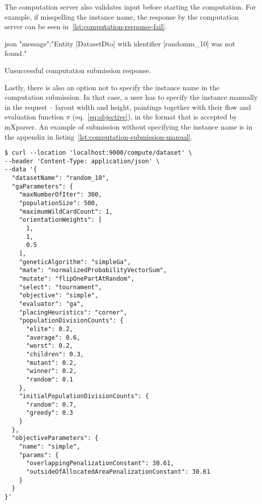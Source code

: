 The computation server also validates input before starting the computation.
For example, if misspelling the instance name, the response by the computation server can be seen in~\ref{lst:computation-response-fail}.

\begin{listing}[h!]
    \centering
    \begin{cminted}[autogobble,breaklines=true]{json}
    {
        "message":"Entity [DatasetDto] with identifier [randomm_10] was not found."
    }
    \end{cminted}
    \caption[Unsuccessful computation submission response]
    {Unsuccessful computation submission response.}
    \label{lst:computation-response-fail}
\end{listing}

Lastly, there is also an option not to specify the instance name in the computation submission.
In that case, a user has to specify the instance manually in the request – layout width and height,
paintings together with their flow and evaluation function $\pi$ (eq.~\ref{eq:objective}), in the format that is accepted by
mXparser\footnotemark[4].
An example of submission without specifying the instance name is in the appendix in listing~\ref{lst:computation-submission-manual}.

\begin{listing}[h!]
\centering
\begin{verbatim}
$ curl --location 'localhost:9000/compute/dataset' \
--header 'Content-Type: application/json' \
--data '{
  "datasetName": "random_10",
  "gaParameters": {
    "maxNumberOfIter": 300,
    "populationSize": 500,
    "maximumWildCardCount": 1,
    "orientationWeights": [
      1,
      1,
      0.5
    ],
    "geneticAlgorithm": "simpleGa",
    "mate": "normalizedProbabilityVectorSum",
    "mutate": "flipOnePartAtRandom",
    "select": "tournament",
    "objective": "simple",
    "evaluator": "ga",
    "placingHeuristics": "corner",
    "populationDivisionCounts": {
      "elite": 0.2,
      "average": 0.6,
      "worst": 0.2,
      "children": 0.3,
      "mutant": 0.2,
      "winner": 0.2,
      "random": 0.1
    },
    "initialPopulationDivisionCounts": {
      "random": 0.7,
      "greedy": 0.3
    }
  },
  "objectiveParameters": {
    "name": "simple",
    "params": {
      "overlappingPenalizationConstant": 30.61,
      "outsideOfAllocatedAreaPenalizationConstant": 30.61
    }
  }
}'
\end{verbatim}
\cprotect\caption[Example of computation submission with instance name]
{Example of computation submission of random\_10 instance using \verb|curl|\footnotemark[2] to a computation server running on \verb|localhost:9000|.}
\label{lst:computation-submission-dataset}
\end{listing}

\footnotetext[3]{\url{https://www.scala-sbt.org/}}
